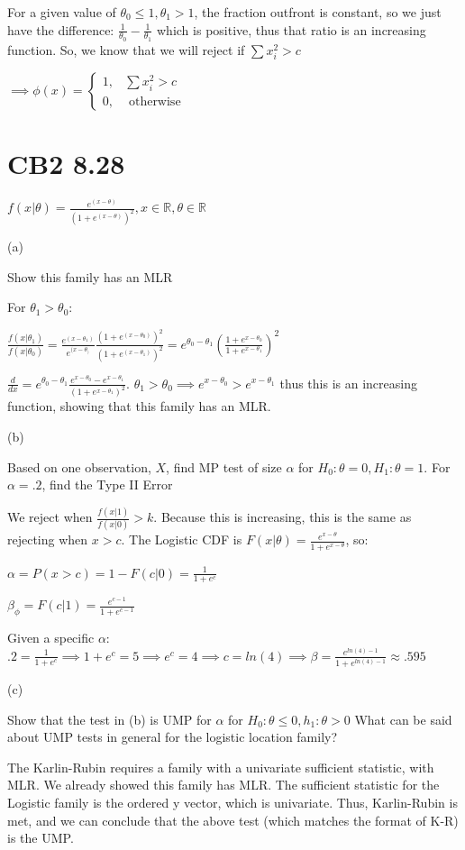 \documentclass{article}
\newcommand{\real}{\mathbb{R}} %
\let\Oldsum=\sum
\renewcommand{\sum}{\Oldsum\limits}
\begin{document}
For a given value of $\theta_0 \le 1, \theta_1 > 1$, the fraction outfront is constant, so we just have the difference: $\frac{1}{\theta_0} - \frac{1}{\theta_1}$ which is positive, thus that ratio is an increasing function. So, we know that we will reject if $\sum x_i^2 > c$

$\implies \phi(x) = \begin{cases} 1, & \sum x_i^2 > c \\ 0, & \text{ otherwise} \end{cases}$


\section{CB2 8.28}

$f(x|\theta) = \frac{e^{(x-\theta)}}{(1+e^{(x-\theta)})^2}, x \in \real, \theta \in \real$

(a)

Show this family has an MLR

For $\theta_1 > \theta_0$:

$\frac{f(x|\theta_1)}{f(x|\theta_0)} = \frac{e^{(x-\theta_1)}}{e^{(x-\theta_)}}\frac{(1+e^{(x-\theta_0)})^2}{(1+e^{(x-\theta_1)})^2} = e^{\theta_0 - \theta_1}(\frac{1+e^{x-\theta_0}}{1+e^{x-\theta_1}})^2$

$\frac{d}{dx} = e^{\theta_0 - \theta_1}\frac{e^{x-\theta_0} - e^{x-\theta_1}}{(1+e^{x-\theta_1})^2}$. $\theta_1 > \theta_0 \implies e^{x-\theta_0} > e^{x-\theta_1}$ thus this is an increasing function, showing that this family has an MLR. 

(b)

Based on one observation, $X$, find MP test of size $\alpha$ for $H_0: \theta = 0, H_1: \theta = 1$. For $\alpha = .2$, find the Type II Error

We reject when $\frac{f(x|1)}{f(x|0)} > k$. Because this is increasing, this is the same as rejecting when $x > c$. The Logistic CDF is $F(x|\theta) = \frac{e^{x-\theta}}{1+e^{x-\theta}}$, so:

$\alpha = P(x > c) = 1 - F(c|0) = \frac{1}{1+e^c}$

$\beta_{\phi} = F(c|1) = \frac{e^{c-1}}{1+e^{c-1}}$

Given a specific $\alpha$: $.2 = \frac{1}{1+e^c} \implies 1+e^c = 5 \implies e^c = 4 \implies c = ln(4) \implies \beta = \frac{e^{ln(4)-1}}{1 + e^{ln(4)-1}} \approx .595$

(c)

Show that the test in (b) is UMP for $\alpha$ for $H_0: \theta \le 0, h_1: \theta > 0$ What can be said about UMP tests in general for the logistic location family?

The Karlin-Rubin requires a family with a univariate sufficient statistic, with MLR. We already showed this family has MLR. The sufficient statistic for the Logistic family is the ordered y vector, which is univariate. Thus, Karlin-Rubin is met, and we can conclude that the above test (which matches the format of K-R) is the UMP. 
\end{document}

